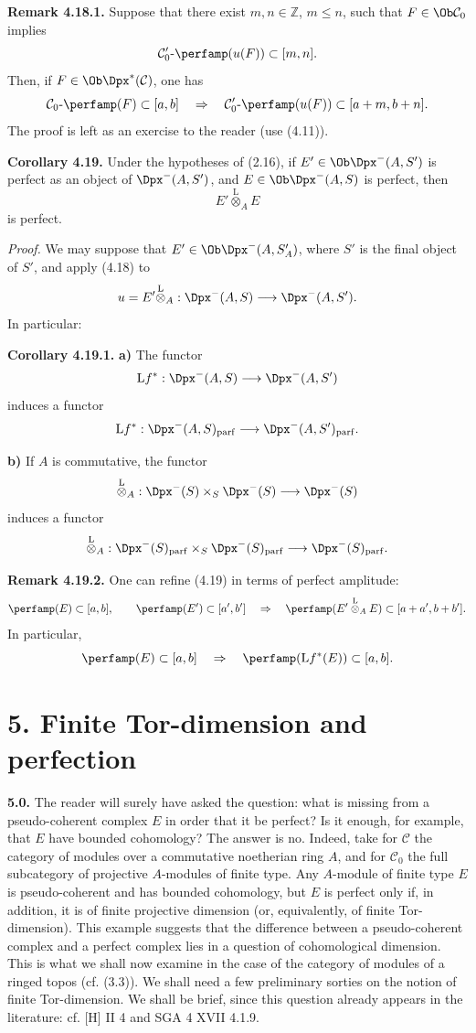 \documentclass[11pt]{article}
\begin{document}
\textbf{Remark 4.18.1.} Suppose that there exist \(m,n\in\mathbb Z\), \(m\leq n\), such that \(F\in\Ob\mathcal C_0\) implies
\[
  \mathcal C'_0\text{-}\perfamp(u(F))\subset[m,n].
\]
Then, if \(F\in\Ob\Dpx^*(\mathcal C)\), one has
\[
  \mathcal C_0\text{-}\perfamp(F)
  \subset [a,b]
  \quad\Rightarrow\quad
  \mathcal C'_0\text{-}\perfamp(u(F))
  \subset [a+m,b+n].
\]
The proof is left as an exercise to the reader (use (4.11)).

\textbf{Corollary 4.19.} Under the hypotheses of (2.16), if \(E'\in\Ob\Dpx^-(A,S')\) is perfect as an object of \(\Dpx^-(A,S')\), and \(E\in\Ob\Dpx^-(A,S)\) is perfect, then
\[
  E'\overset{\mathrm L}{\otimes}_A E
\]
is perfect.

\emph{Proof.} We may suppose that \(E'\in\Ob\Dpx^-(A,S'_A)\), where \(S'\) is the final object of \(S'\), and apply (4.18) to
\[
  u=E'\overset{\mathrm L}{\otimes}_A:
  \Dpx^-(A,S)\longrightarrow \Dpx^-(A,S').
\]
In particular:

\textbf{Corollary 4.19.1.} \textbf{a)} The functor
\[
  \mathrm L f^*:\Dpx^-(A,S)\longrightarrow \Dpx^-(A,S')
\]
induces a functor
\[
  \mathrm L f^*:\Dpx^-(A,S)_{\mathrm{parf}}
  \longrightarrow
  \Dpx^-(A,S')_{\mathrm{parf}}.
\]

\textbf{b)} If \(A\) is commutative, the functor
\[
  \overset{\mathrm L}{\otimes}_A:
  \Dpx^-(S)\times_S\Dpx^-(S)
  \longrightarrow \Dpx^-(S)
\]
induces a functor
\[
  \overset{\mathrm L}{\otimes}_A:
  \Dpx^-(S)_{\mathrm{parf}}\times_S\Dpx^-(S)_{\mathrm{parf}}
  \longrightarrow \Dpx^-(S)_{\mathrm{parf}}.
\]

\textbf{Remark 4.19.2.} One can refine (4.19) in terms of perfect amplitude:
\[
  \perfamp(E)\subset[a,b],\qquad
  \perfamp(E')\subset[a',b']
  \quad\Rightarrow\quad
  \perfamp(E'\overset{\mathrm L}{\otimes}_A E)\subset[a+a',b+b'].
\]
In particular,
\[
  \perfamp(E)\subset[a,b]
  \quad\Rightarrow\quad
  \perfamp(\mathrm L f^*(E))\subset[a,b].
\]

\section*{5. Finite Tor-dimension and perfection}

\textbf{5.0.} The reader will surely have asked the question: what is missing from a pseudo-coherent complex \(E\) in order that it be perfect? Is it enough, for example, that \(E\) have bounded cohomology? The answer is no. Indeed, take for \(\mathcal C\) the category of modules over a commutative noetherian ring \(A\), and for \(\mathcal C_0\) the full subcategory of projective \(A\)-modules of finite type. Any \(A\)-module of finite type \(E\) is pseudo-coherent and has bounded cohomology, but \(E\) is perfect only if, in addition, it is of finite projective dimension (or, equivalently, of finite Tor-dimension). This example suggests that the difference between a pseudo-coherent complex and a perfect complex lies in a question of cohomological dimension. This is what we shall now examine in the case of the category of modules of a ringed topos (cf. (3.3)). We shall need a few preliminary sorties on the notion of finite Tor-dimension. We shall be brief, since this question already appears in the literature: cf. [H] II 4 and SGA 4 XVII 4.1.9.
\end{document}
